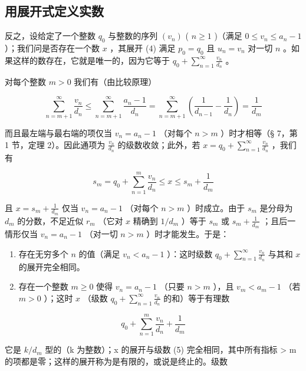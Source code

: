 \subsection{用展开式定义实数}

反之，设给定了一个整数 \(q_0\) 与整数的序列 \((v_n)\) ( \(n \geqslant 1\) )（满足 \(0 \leqslant v_n \leqslant a_n - 1\) ）；我们问是否存在一个数 \(x\) ，其展开 (4) 满足 \(p_0 = q_0\) 且 \(u_n = v_n\) 对一切 \(n\) 。如果这样的数存在，它就是唯一的，因为它等于 \(q_0 + \sum_{n=1}^{\infty} \frac{v_n}{d_n}\) 。

对每个整数 \(m > 0\) 我们有（由比较原理）

\[
\sum_ {n = m + 1} ^ {\infty} \frac {v _ {n}}{d _ {n}} \leqslant \sum_ {n = m + 1} ^ {\infty} \frac {a _ {n} - 1}{d _ {n}} = \sum_ {n = m + 1} ^ {\infty} \left(\frac {1}{d _ {n - 1}} - \frac {1}{d _ {n}}\right) = \frac {1}{d _ {m}}
\]

而且最左端与最右端的项仅当 \(v_{n} = a_{n} - 1\) （对每个 \(n > m\) ）时才相等（§ 7，第 1 节，定理 2）。因此通项为 \(\frac{v_n}{d_n}\) 的级数收敛；此外，若 \(x = q_0 + \sum_{n=1}^{\infty} \frac{v_n}{d_n}\) ，我们有

\[
s _ {m} = q _ {0} + \sum_ {n = 1} ^ {m} \frac {v _ {n}}{d _ {n}} \leqslant x \leqslant s _ {m} + \frac {1}{d _ {m}}
\]

且 \(x = s_m + \frac{1}{d_m}\) 仅当 \(v_n = a_n - 1\) （对每个 \(n > m\) ）时成立。由于 \(s_m\) 是分母为 \(d_m\) 的分数，不足近似 \(r_m\) （它对 \(x\) 精确到 \(1/d_m\) ）等于 \(s_m\) 或 \(s_m + \frac{1}{d_m}\) ；且后一情形仅当 \(v_{n} = a_{n} - 1\) （对一切 \(n > m\) ）时才能发生。于是：

\begin{enumerate}
\def\labelenumi{(\roman{enumi})}
\item
  存在无穷多个 \(n\) 的值（满足 \(v_{n} < a_{n} - 1\) ）：这时级数 \(q_{0} + \sum_{n=1}^{\infty} \frac{v_{n}}{d_{n}}\) 与其和 \(x\) 的展开完全相同。
\item
  存在一个整数 \(m \geqslant 0\) 使得 \(v_{n} = a_{n} - 1\) （只要 \(n > m\) ），且 \(v_{m} < a_{m} - 1\) （若 \(m > 0\) ）；这时 \(x\) （级数 \(q_{0} + \sum_{n=1}^{\infty} \frac{v_{n}}{d_{n}}\) 的和）等于有理数
\end{enumerate}

\[
q _ {0} + \sum_ {n = 1} ^ {m} \frac {v _ {n}}{d _ {n}} + \frac {1}{d _ {m}}\tag{5}
\]

它是 \(k/d_{m}\) 型的（k 为整数）；x 的展开与级数 (5) 完全相同，其中所有指标 \textgreater{} m 的项都是零；这样的展开称为是有限的，或说是终止的。级数

